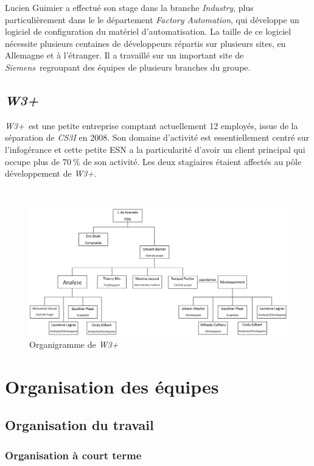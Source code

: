 \documentclass[a4paper, oneside, 12pt]{article}
\def\www{\emph{W3+}}
\def\siemens{\emph{Siemens}}
\begin{document}
Lucien {\sc Guimier} a effectué son stage dans la branche \textit{Industry}, plus particulièrement dans le le département \textit{Factory Automation}, qui développe un logiciel de configuration du matériel d’automatisation. La taille de ce logiciel nécessite plusieurs centaines de développeurs répartis sur plusieurs sites, en Allemagne et à l’étranger. Il a travaillé sur un important site de \siemens\ regroupant des équipes de plusieurs branches du groupe.

\subsection{\www}

\www\ est une petite entreprise comptant actuellement 12 employés, issue de la séparation de \emph {CS3I} en 2008. Son domaine d'activité est essentiellement centré sur l'infogérance et cette petite ESN a la particularité d'avoir un client principal qui occupe plus de 70$~$\% de son activité. Les deux stagiaires étaient affectés au pôle développement de \www.

\ 

\begin{figure}[H]
	\centering
	\includegraphics[width=16cm]{img/org-www.png}
	\caption{Organigramme de \www}
\end{figure}

\newpage
\section{Organisation des équipes}

\subsection{Organisation du travail}

\subsubsection{Organisation à court terme}
\end{document}
